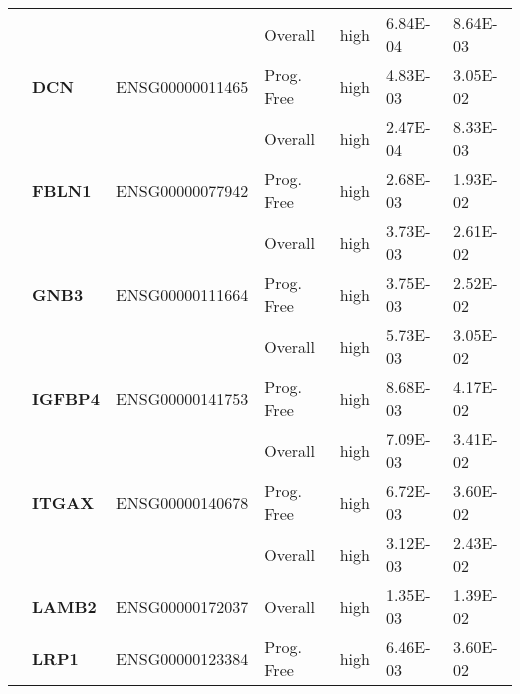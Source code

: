 {\begin{longtable}{|>{\bfseries}p{3cm}|>{\bfseries}p{1.9cm}|p{3cm}|p{2cm}|p{2cm}|p{1.5cm}|p{1.5cm}|}
        \hhline{~~~----}
                                                                &          &                 & Overall    & high & 6.84E-04 & 8.64E-03 \\
        \hhline{~------}
                                                                & DCN      & ENSG00000011465 & Prog. Free & high & 4.83E-03 & 3.05E-02 \\
        \hhline{~~~----}
                                                                &          &                 & Overall    & high & 2.47E-04 & 8.33E-03 \\
        \hhline{~------}
                                                                & FBLN1    & ENSG00000077942 & Prog. Free & high & 2.68E-03 & 1.93E-02 \\
        \hhline{~~~----}
                                                                &          &                 & Overall    & high & 3.73E-03 & 2.61E-02 \\
        \hhline{~------}
                                                                & GNB3     & ENSG00000111664 & Prog. Free & high & 3.75E-03 & 2.52E-02 \\
        \hhline{~~~----}
                                                                &          &                 & Overall    & high & 5.73E-03 & 3.05E-02 \\
        \hhline{~------}
                                                                & IGFBP4   & ENSG00000141753 & Prog. Free & high & 8.68E-03 & 4.17E-02 \\
        \hhline{~~~----}
                                                                &          &                 & Overall    & high & 7.09E-03 & 3.41E-02 \\
        \hhline{~------}
                                                                & ITGAX    & ENSG00000140678 & Prog. Free & high & 6.72E-03 & 3.60E-02 \\
        \hhline{~~~----}
                                                                &          &                 & Overall    & high & 3.12E-03 & 2.43E-02 \\
        \hhline{~------}
                                                                & LAMB2    & ENSG00000172037 & Overall    & high & 1.35E-03 & 1.39E-02 \\
        \hhline{~------}
                                                                & LRP1     & ENSG00000123384 & Prog. Free & high & 6.46E-03 & 3.60E-02 \\

\end{longtable}}
